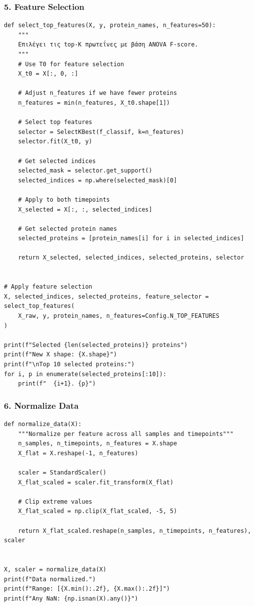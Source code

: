 \subsubsection*{5. Feature Selection}
 
\begin{lstlisting}
def select_top_features(X, y, protein_names, n_features=50):
    """
    Επιλέγει τις top-K πρωτεΐνες με βάση ANOVA F-score.
    """
    # Use T0 for feature selection
    X_t0 = X[:, 0, :]
 
    # Adjust n_features if we have fewer proteins
    n_features = min(n_features, X_t0.shape[1])
 
    # Select top features
    selector = SelectKBest(f_classif, k=n_features)
    selector.fit(X_t0, y)
 
    # Get selected indices
    selected_mask = selector.get_support()
    selected_indices = np.where(selected_mask)[0]
 
    # Apply to both timepoints
    X_selected = X[:, :, selected_indices]
 
    # Get selected protein names
    selected_proteins = [protein_names[i] for i in selected_indices]
 
    return X_selected, selected_indices, selected_proteins, selector
 
 
# Apply feature selection
X, selected_indices, selected_proteins, feature_selector = select_top_features(
    X_raw, y, protein_names, n_features=Config.N_TOP_FEATURES
)
 
print(f"Selected {len(selected_proteins)} proteins")
print(f"New X shape: {X.shape}")
print(f"\nTop 10 selected proteins:")
for i, p in enumerate(selected_proteins[:10]):
    print(f"  {i+1}. {p}")
\end{lstlisting}
 
\subsubsection*{6. Normalize Data}
 
\begin{lstlisting}
def normalize_data(X):
    """Normalize per feature across all samples and timepoints"""
    n_samples, n_timepoints, n_features = X.shape
    X_flat = X.reshape(-1, n_features)
 
    scaler = StandardScaler()
    X_flat_scaled = scaler.fit_transform(X_flat)
 
    # Clip extreme values
    X_flat_scaled = np.clip(X_flat_scaled, -5, 5)
 
    return X_flat_scaled.reshape(n_samples, n_timepoints, n_features), scaler
 
 
X, scaler = normalize_data(X)
print(f"Data normalized.")
print(f"Range: [{X.min():.2f}, {X.max():.2f}]")
print(f"Any NaN: {np.isnan(X).any()}")
\end{lstlisting}
 
